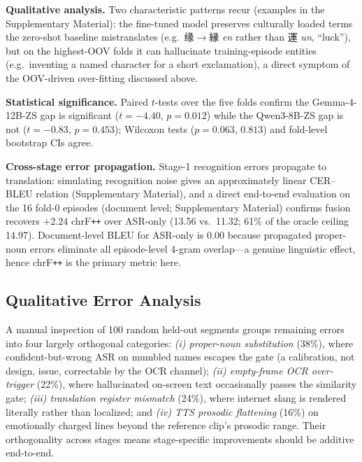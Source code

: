 \documentclass[journal]{IEEEtran}
\begin{document}
\textbf{Qualitative analysis.}
Two characteristic patterns recur (examples in the Supplementary Material): the fine-tuned model preserves culturally loaded terms the zero-shot baseline mistranslates (e.g.\ 缘$\to$縁 \emph{en} rather than 運 \emph{un}, ``luck''), but on the highest-OOV folds it can hallucinate training-episode entities (e.g.\ inventing a named character for a short exclamation), a direct symptom of the OOV-driven over-fitting discussed above.

\textbf{Statistical significance.}
Paired $t$-tests over the five folds confirm the Gemma-4-12B-ZS gap is significant ($t=-4.40$, $p=0.012$) while the Qwen3-8B-ZS gap is not ($t=-0.83$, $p=0.453$); Wilcoxon tests ($p=0.063$, $0.813$) and fold-level bootstrap CIs agree.

\textbf{Cross-stage error propagation.}
Stage-1 recognition errors propagate to translation: simulating recognition noise gives an approximately linear CER--BLEU relation (Supplementary Material), and a direct end-to-end evaluation on the 16 fold-0 episodes (document level; Supplementary Material) confirms fusion recovers $+2.24$ chrF\texttt{++} over ASR-only (13.56 vs.\ 11.32; 61\% of the oracle ceiling 14.97).
Document-level BLEU for ASR-only is 0.00 because propagated proper-noun errors eliminate all episode-level 4-gram overlap---a genuine linguistic effect, hence chrF\texttt{++} is the primary metric here.





\subsection{Qualitative Error Analysis}
A manual inspection of 100 random held-out segments groups remaining errors into four largely orthogonal categories: \emph{(i) proper-noun substitution} (38\%), where confident-but-wrong ASR on mumbled names escapes the gate (a calibration, not design, issue, correctable by the OCR channel); \emph{(ii) empty-frame OCR over-trigger} (22\%), where hallucinated on-screen text occasionally passes the similarity gate; \emph{(iii) translation register mismatch} (24\%), where internet slang is rendered literally rather than localized; and \emph{(iv) TTS prosodic flattening} (16\%) on emotionally charged lines beyond the reference clip's prosodic range.
Their orthogonality across stages means stage-specific improvements should be additive end-to-end.
\end{document}

